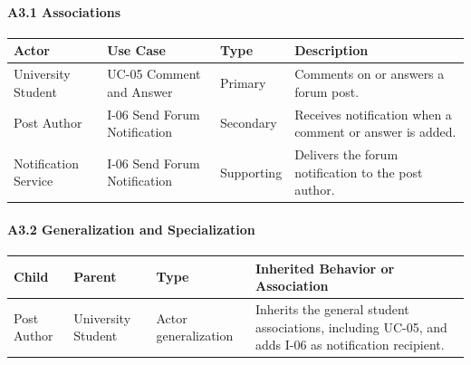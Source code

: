 \documentclass[12pt]{article}
\renewcommand{\baselinestretch}{1.5}
\begin{document}
\hypertarget{sec:a3-1-associations}{}
\paragraph*{A3.1 Associations}
\par\medskip

\begingroup
\small
\renewcommand{\baselinestretch}{1.0}\selectfont
\renewcommand{\arraystretch}{1.15}
\setlength{\tabcolsep}{6pt}
\begin{longtable}{|>{\raggedright\arraybackslash}p{}|>{\raggedright\arraybackslash}p{}|>{\raggedright\arraybackslash}p{}|>{\raggedright\arraybackslash}p{}|}
\hline
\textbf{Actor} & \textbf{Use Case} & \textbf{Type} & \textbf{Description} \\ \hline
\endhead
University Student & UC-05 Comment and Answer & Primary & Comments on or answers a forum post. \\ \hline
Post Author & I-06 Send Forum Notification & Secondary & Receives notification when a comment or answer is added. \\ \hline
Notification Service & I-06 Send Forum Notification & Supporting & Delivers the forum notification to the post author. \\ \hline
\end{longtable}
\endgroup
\par\medskip

\hypertarget{sec:a3-2-generalization-and-specialization}{}
\paragraph*{A3.2 Generalization and Specialization}
\par\medskip

\begingroup
\small
\renewcommand{\baselinestretch}{1.0}\selectfont
\renewcommand{\arraystretch}{1.15}
\setlength{\tabcolsep}{6pt}
\begin{longtable}{|>{\raggedright\arraybackslash}p{}|>{\raggedright\arraybackslash}p{}|>{\raggedright\arraybackslash}p{}|>{\raggedright\arraybackslash}p{}|}
\hline
\textbf{Child} & \textbf{Parent} & \textbf{Type} & \textbf{Inherited Behavior or Association} \\ \hline
\endhead
Post Author & University Student & Actor generalization & Inherits the general student associations, including UC-05, and adds I-06 as notification recipient. \\ \hline
\end{longtable}
\endgroup
\par\medskip
\end{document}
